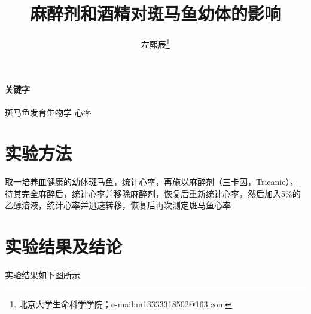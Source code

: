 \documentclass[UTF-8]{ctexart}
\author{左熙辰\thanks{北京大学生命科学学院；e-mail:m13333318502@163.com}}
\date{}
\title{麻醉剂和酒精对斑马鱼幼体的影响}
\begin{document}
    \maketitle
    \begin{abstract}
        
    \end{abstract}
    \paragraph*{关键字}斑马鱼\text{ }发育生物学\text{ } 心率 
    \section{实验方法}
    取一培养皿健康的幼体斑马鱼，统计心率，再施以麻醉剂（三卡因，Tricanie），待其完全麻醉后，统计心率并移除麻醉剂，恢复后重新统计心率，然后加入5\%的乙醇溶液，统计心率并迅速转移，恢复后再次测定斑马鱼心率
    \section{实验结果及结论}
    实验结果如下图所示
    \begin{figure}[h]
        \centering
        
    \end{figure}
\end{document}
